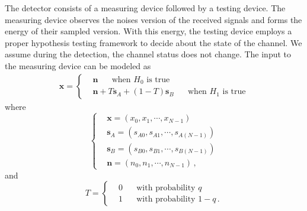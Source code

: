 The detector consists of a measuring device followed by a testing device. The measuring device observes the noises version of the received signals and forms the energy of their sampled version. With this energy, the testing device employs a proper hypothesis testing framework to decide about the state of the channel. We assume during the detection, the channel status does not change. The input to the measuring device can be modeled as 
\begin{eqnarray}
  \mathbf{x} = \begin{cases}
    &\mathbf{n}\;\;\;\;\;\;\text{when $H_0$ is true}\\
    &\mathbf{n} + T\mathbf{s}_A + (1-T)\mathbf{s}_B\;\;\;\;\;\;\text{when $H_1$ is true}
  \end{cases}
  \label{equ:input2energy}
\end{eqnarray}
where
\begin{equation}
  \begin{cases}
	&\mathbf{x} = (x_0, x_1, \cdots, x_{N-1})\\
	&\mathbf{s}_A = (s_{A0}, s_{A1}, \cdots, s_{A(N-1)})\\
	&\mathbf{s}_B = (s_{B0}, s_{B1}, \cdots, s_{B(N-1)})\\
	&\mathbf{n} = (n_{0}, n_{1}, \cdots, n_{N-1})\,,
  \end{cases}
  \label{150621a1}
\end{equation}
and 
\begin{equation}
  T = \begin{cases}
    &0\;\;\;\;\;\;\text{with probability $q$}\\
    &1\;\;\;\;\;\;\text{with probability $1-q$}\,.
  \end{cases}
  \label{150621a2}
\end{equation}

